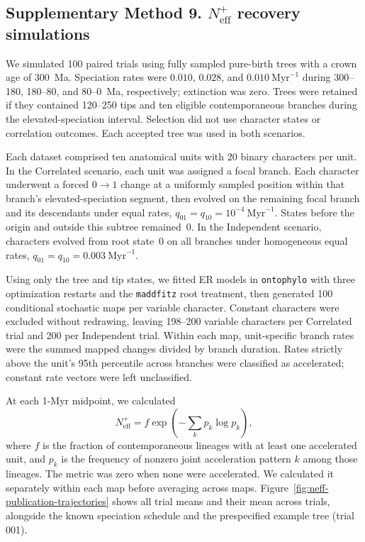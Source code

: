 \documentclass[10pt,a4paper]{article}
\begin{document}
\subsection*{Supplementary Method 9. \(N_{\mathrm{eff}}^{+}\) recovery simulations}

We simulated 100 paired trials using fully sampled pure-birth trees with a
crown age of 300~Ma. Speciation rates were $0.010$, $0.028$, and
$0.010~\mathrm{Myr}^{-1}$ during 300--180, 180--80, and 80--0~Ma,
respectively; extinction was zero. Trees were retained if they contained
120--250 tips and ten eligible contemporaneous branches during the
elevated-speciation interval. Selection did not use character states or
correlation outcomes. Each accepted tree was used in both scenarios.

Each dataset comprised ten anatomical units with 20 binary characters per
unit. In the Correlated scenario, each unit was assigned a focal branch.
Each character underwent a forced $0\to1$ change at a uniformly sampled
position within that branch's elevated-speciation segment, then evolved
on the remaining focal branch and its descendants under equal rates,
$q_{01}=q_{10}=10^{-4}~\mathrm{Myr}^{-1}$. States before the origin and outside
this subtree remained~0. In the Independent scenario,
characters evolved from root state~0 on all branches under homogeneous
equal rates, $q_{01}=q_{10}=0.003~\mathrm{Myr}^{-1}$.

Using only the tree and tip states, we fitted ER models in \texttt{ontophylo}
with three optimization restarts and the \texttt{maddfitz} root treatment,
then generated 100 conditional stochastic maps per variable character.
Constant characters were excluded without redrawing, leaving 198--200
variable characters per Correlated trial and 200 per Independent trial.
Within each map, unit-specific branch rates were the summed mapped changes
divided by branch duration. Rates strictly above the unit's 95th percentile
across branches were classified as accelerated; constant rate vectors were
left unclassified.

At each 1-Myr midpoint, we calculated
\[
N_{\mathrm{eff}}^{+}=f\exp\!\left(-\sum_k p_k\log p_k\right),
\]
where $f$ is the fraction of contemporaneous lineages with at least one
accelerated unit, and $p_k$ is the frequency of nonzero joint acceleration
pattern $k$ among those lineages. The metric was zero when none were
accelerated. We calculated it separately within each map before averaging
across maps. Figure~\ref{fig:neff-publication-trajectories} shows all trial
means and their mean across trials, alongside the known speciation schedule
and the prespecified example tree (trial 001).
\end{document}
